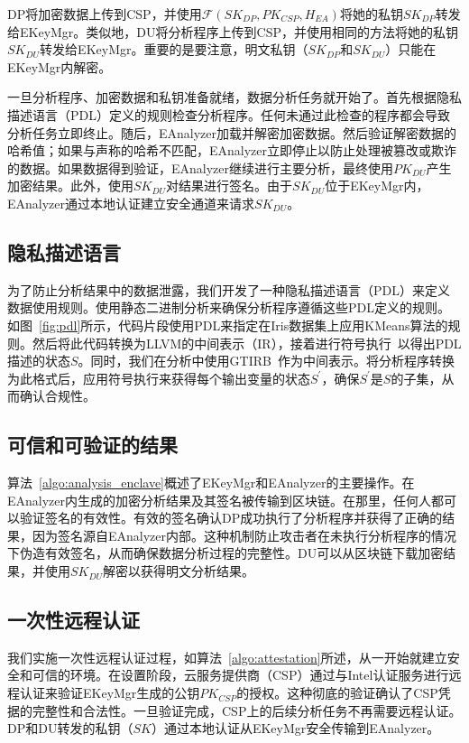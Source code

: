 DP将加密数据上传到CSP，并使用$\mathcal{F}(SK_{DP}, PK_{CSP}, H_{EA})$将她的私钥$SK_{DP}$转发给EKeyMgr。类似地，DU将分析程序上传到CSP，并使用相同的方法将她的私钥$SK_{DU}$转发给EKeyMgr。重要的是要注意，明文私钥（$SK_{DP}$和$SK_{DU}$）只能在EKeyMgr内解密。

一旦分析程序、加密数据和私钥准备就绪，数据分析任务就开始了。首先根据隐私描述语言（PDL）定义的规则检查分析程序。任何未通过此检查的程序都会导致分析任务立即终止。随后，EAnalyzer加载并解密加密数据。然后验证解密数据的哈希值；如果与声称的哈希不匹配，EAnalyzer立即停止以防止处理被篡改或欺诈的数据。如果数据得到验证，EAnalyzer继续进行主要分析，最终使用$PK_{DU}$产生加密结果。此外，使用$SK_{DU}$对结果进行签名。由于$SK_{DU}$位于EKeyMgr内，EAnalyzer通过本地认证建立安全通道来请求$SK_{DU}$。


\subsection{隐私描述语言}
为了防止分析结果中的数据泄露，我们开发了一种隐私描述语言（PDL）来定义数据使用规则。使用静态二进制分析来确保分析程序遵循这些PDL定义的规则。如图~\ref{fig:pdl}所示，代码片段使用PDL来指定在Iris数据集上应用KMeans算法的规则。然后将此代码转换为LLVM的中间表示（IR），接着进行符号执行~\cite{king1976symbolic,baldoni2018survey}以得出PDL描述的状态$S$。同时，我们在分析中使用GTIRB~\cite{schulte2019gtirb}作为中间表示。将分析程序转换为此格式后，应用符号执行来获得每个输出变量的状态$S^{\prime}$，确保$S^{\prime}$是$S$的子集，从而确认合规性。

\subsection{可信和可验证的结果}
算法~\ref{algo:analysis_enclave}概述了EKeyMgr和EAnalyzer的主要操作。在EAnalyzer内生成的加密分析结果及其签名被传输到区块链。在那里，任何人都可以验证签名的有效性。有效的签名确认DP成功执行了分析程序并获得了正确的结果，因为签名源自EAnalyzer内部。这种机制防止攻击者在未执行分析程序的情况下伪造有效签名，从而确保数据分析过程的完整性。DU可以从区块链下载加密结果，并使用$SK_{DU}$解密以获得明文分析结果。


\subsection{一次性远程认证}
我们实施一次性远程认证过程，如算法~\ref{algo:attestation}所述，从一开始就建立安全和可信的环境。在设置阶段，云服务提供商（CSP）通过与Intel认证服务进行远程认证来验证EKeyMgr生成的公钥$PK_{CSP}$的授权。这种彻底的验证确认了CSP凭据的完整性和合法性。一旦验证完成，CSP上的后续分析任务不再需要远程认证。DP和DU转发的私钥（$SK$）通过本地认证从EKeyMgr安全传输到EAnalyzer。 